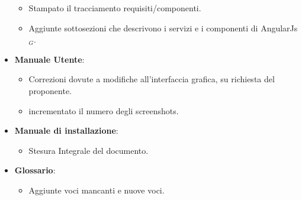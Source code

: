 \begin{itemize}
\begin{itemize}
		\item Stampato il tracciamento requisiti/componenti.
		\item Aggiunte sottosezioni che descrivono i servizi e i componenti di AngularJs$_G$.
	\end{itemize}
	\item \textbf{Manuale Utente}:
	\begin{itemize}
		\item Correzioni dovute a modifiche all'interfaccia grafica, su richiesta del proponente.
		\item incrementato il numero degli screenshots.
	\end{itemize}
	\item \textbf{Manuale di installazione}:
	\begin{itemize}
		\item  Stesura Integrale del documento.
	\end{itemize}	
	\item \textbf{Glossario}:
	\begin{itemize}
		\item Aggiunte voci mancanti e nuove voci.
	\end{itemize}
\end{itemize}